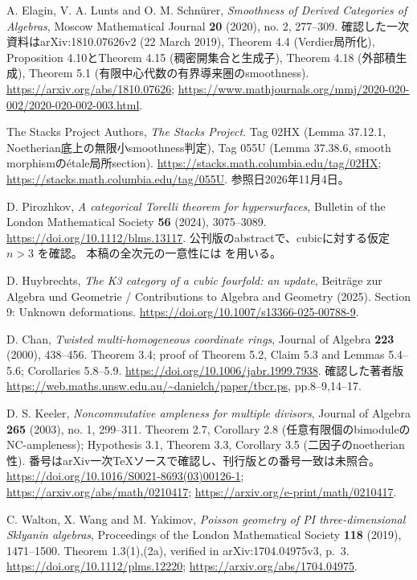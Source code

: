 A. Elagin, V. A. Lunts and O. M. Schn\"urer,
\emph{Smoothness of Derived Categories of Algebras},
Moscow Mathematical Journal \textbf{20} (2020), no. 2, 277--309.
確認した一次資料はarXiv:1810.07626v2 (22 March 2019),
Theorem 4.4 (Verdier局所化), Proposition 4.10とTheorem 4.15 (稠密開集合と生成子),
Theorem 4.18 (外部積生成), Theorem 5.1 (有限中心代数の有界導来圏のsmoothness).
\url{https://arxiv.org/abs/1810.07626};
\url{https://www.mathjournals.org/mmj/2020-020-002/2020-020-002-003.html}.

The Stacks Project Authors, \emph{The Stacks Project}.
Tag 02HX (Lemma 37.12.1, Noetherian底上の無限小smoothness判定),
Tag 055U (Lemma 37.38.6, smooth morphismのétale局所section).
\url{https://stacks.math.columbia.edu/tag/02HX};
\url{https://stacks.math.columbia.edu/tag/055U}.
参照日2026年11月4日。

D. Pirozhkov, \emph{A categorical Torelli theorem for hypersurfaces},
Bulletin of the London Mathematical Society \textbf{56} (2024), 3075--3089.
\url{https://doi.org/10.1112/blms.13117}.
公刊版のabstractで、cubicに対する仮定 \(n>3\) を確認。
本稿の全次元の一意性には \cite[Theorem 1.7]{LZ} を用いる。

D. Huybrechts, \emph{The K3 category of a cubic fourfold: an update},
Beiträge zur Algebra und Geometrie / Contributions to Algebra and Geometry (2025).
Section 9: Unknown deformations.
\url{https://doi.org/10.1007/s13366-025-00788-9}.

D. Chan, \emph{Twisted multi-homogeneous coordinate rings},
Journal of Algebra \textbf{223} (2000), 438--456.
Theorem 3.4; proof of Theorem 5.2, Claim 5.3 and Lemmas 5.4--5.6;
Corollaries 5.8--5.9.
\url{https://doi.org/10.1006/jabr.1999.7938}.
確認した著者版 \url{https://web.maths.unsw.edu.au/~danielch/paper/tbcr.ps}, pp.8--9,14--17.

D. S. Keeler, \emph{Noncommutative ampleness for multiple divisors},
Journal of Algebra \textbf{265} (2003), no. 1, 299--311.
Theorem 2.7, Corollary 2.8 (任意有限個のbimoduleのNC-ampleness);
Hypothesis 3.1, Theorem 3.3, Corollary 3.5 (二因子のnoetherian性).
番号はarXiv一次TeXソースで確認し、刊行版との番号一致は未照合。
\url{https://doi.org/10.1016/S0021-8693(03)00126-1};
\url{https://arxiv.org/abs/math/0210417};
\url{https://arxiv.org/e-print/math/0210417}.

C. Walton, X. Wang and M. Yakimov,
\emph{Poisson geometry of PI three-dimensional Sklyanin algebras},
Proceedings of the London Mathematical Society \textbf{118} (2019), 1471--1500.
Theorem 1.3(1),(2a), verified in arXiv:1704.04975v3, p.~3.
\url{https://doi.org/10.1112/plms.12220};
\url{https://arxiv.org/abs/1704.04975}.

